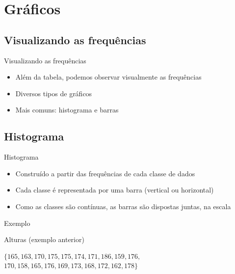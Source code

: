 \documentclass{beamer}
\begin{document}
\section{Gráficos}

\subsection{Visualizando as frequências}

\begin{frame}{Visualizando as frequências}
  \begin{itemize}
  \item Além da tabela, podemos observar \alert{visualmente} as frequências
  \item Diversos tipos de gráficos
  \item Mais comuns: histograma e barras
  \end{itemize}
\end{frame}

\subsection{Histograma}

\begin{frame}{Histograma}
  \begin{itemize}
  \item Construído a partir das frequências de cada \alert{classe} de dados
  \item Cada classe é representada por uma barra (vertical ou horizontal)
  \item Como as classes são contínuas, as \alert{barras} são dispostas \alert{juntas}, na escala
  \end{itemize}
\end{frame}

\begin{frame}{Exemplo}
  \begin{example}
    Alturas (exemplo anterior)

    \bigskip
    \centering $ \{ 165,163,170,175,175,174,171,186,159,176,$
$170,158,165,176,169,173,168,172,162,178 \} $

  \end{example}
\end{frame}
\end{document}
